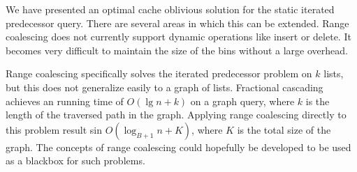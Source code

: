 We have presented an optimal cache oblivious solution for the static 
iterated predecessor query. There are several areas in which this can be extended. 
Range coalescing does not currently support dynamic operations like insert or delete.
It becomes very difficult to maintain the size of the bins without a large overhead.

Range coalescing specifically solves the iterated predecessor problem on $k$ lists, but this does 
not generalize easily to a graph of lists. Fractional cascading achieves an running time of
$O(\lg n + k)$ on a graph query, where $k$ is the length of the traversed path in the graph. 
Applying range coalescing directly to this problem result sin $O(\log_{B+1} n + K)$, 
where $K$ is the total size of the graph. The concepts of range coalescing could 
hopefully be developed to be used as a blackbox for such problems.

